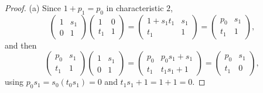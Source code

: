 \documentclass[11pt]{amsart}
\theoremstyle{definition}
\theoremstyle{plain}
\begin{document}
\begin{proof}
(a) Since \(1+p_1=p_0\) in characteristic \(2\),
\[
 \begin{pmatrix}1&s_1\\0&1\end{pmatrix}
 \begin{pmatrix}1&0\\t_1&1\end{pmatrix}
 =\begin{pmatrix}1+s_1t_1&s_1\\ t_1&1\end{pmatrix}
 =\begin{pmatrix}p_0&s_1\\ t_1&1\end{pmatrix},
\]
and then
\[
 \begin{pmatrix}p_0&s_1\\ t_1&1\end{pmatrix}
 \begin{pmatrix}1&s_1\\0&1\end{pmatrix}
 =\begin{pmatrix}p_0&p_0s_1+s_1\\ t_1&t_1s_1+1\end{pmatrix}
 =\begin{pmatrix}p_0&s_1\\ t_1&0\end{pmatrix},
\]
using \(p_0s_1=s_0(t_0s_1)=0\) and \(t_1s_1+1=1+1=0\).


\end{proof}
\end{document}
